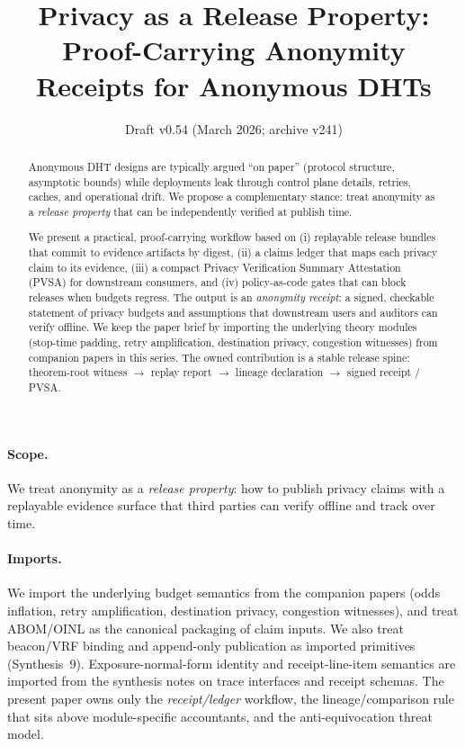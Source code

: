 \documentclass[11pt]{article}
\title{Privacy as a Release Property:\\
Proof-Carrying Anonymity Receipts for Anonymous DHTs}
\author{}
\date{Draft v0.54 (March 2026; archive v241)}
\begin{document}
\maketitle

\begin{abstract}
Anonymous DHT designs are typically argued ``on paper'' (protocol structure, asymptotic bounds) while deployments leak through control plane details, retries, caches, and operational drift.
We propose a complementary stance: treat anonymity as a \emph{release property} that can be independently verified at publish time.

We present a practical, proof-carrying workflow based on (i) replayable release bundles that commit to evidence artifacts by digest, (ii) a claims ledger that maps each privacy claim to its evidence, (iii) a compact Privacy Verification Summary Attestation (PVSA) for downstream consumers, and (iv) policy-as-code gates that can block releases when budgets regress.
The output is an \emph{anonymity receipt}: a signed, checkable statement of privacy budgets and assumptions that downstream users and auditors can verify offline.
We keep the paper brief by importing the underlying theory modules (stop-time padding, retry amplification, destination privacy, congestion witnesses) from companion papers in this series.
The owned contribution is a stable release spine: theorem-root witness $\rightarrow$ replay report $\rightarrow$ lineage declaration $\rightarrow$ signed receipt / PVSA.
\end{abstract}

\paragraph{Scope.}
We treat anonymity as a \emph{release property}: how to publish privacy claims with a replayable evidence surface that third parties can verify offline and track over time.

\paragraph{Imports.}
We import the underlying budget semantics from the companion papers (odds inflation, retry amplification, destination privacy, congestion witnesses), and treat ABOM/OINL as the canonical packaging of claim inputs.\cite{series:oddsinflation,series:abomoinl}
We also treat beacon/VRF binding and append-only publication as imported primitives (Synthesis~9).\cite{series:transparencyprimitives}
Exposure-normal-form identity and receipt-line-item semantics are imported from the synthesis notes on trace interfaces and receipt schemas.\cite{series:traceifaces,series:receiptitems}
The present paper owns only the \emph{receipt/ledger} workflow, the lineage/comparison rule that sits above module-specific accountants, and the anti-equivocation threat model.
\end{document}
